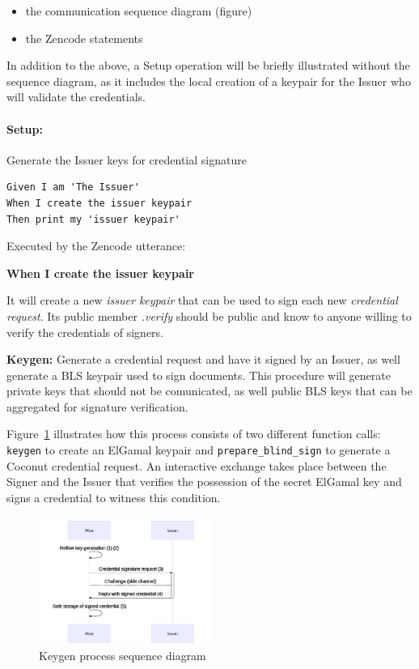 \documentclass[twocolumn]{article}
\begin{document}
\begin{itemize}
  \item the communication sequence diagram (figure)
  \item the Zencode statements
\end{itemize}

In addition to the above, a Setup operation will be briefly
illustrated without the sequence diagram, as it includes the local
creation of a keypair for the Issuer who will validate the
credentials.

\paragraph*{Setup:} Generate the Issuer keys for credential signature

\begin{lstlisting}[style=zencode]
Given I am 'The Issuer'
When I create the issuer keypair
Then print my 'issuer keypair'  
\end{lstlisting}

Executed by the Zencode utterance:

\textbf{When I create the issuer keypair}

It will create a new \emph{issuer keypair} that can be used to sign
each new \emph{credential request}. Its public member \emph{.verify}
should be public and know to anyone willing to verify the credentials
of signers.

\textbf{Keygen:} Generate a credential request and have it signed by
an Issuer, as well generate a BLS keypair used to sign documents. This
procedure will generate private keys that should not be comunicated,
as well public BLS keys that can be aggregated for signature
verification.

Figure~\ref{fig:keygen} illustrates how this process consists of two
different function calls: \verb!keygen! to create an ElGamal keypair
and \verb!prepare_blind_sign! to generate a Coconut credential
request. An interactive exchange takes place between the Signer and
the Issuer that verifies the possession of the secret ElGamal key and
signs a credential to witness this condition.

\begin{figure}
  \caption{Keygen process sequence diagram}
  \label{fig:keygen}
  \centering
  \includegraphics[width=0.5\textwidth]{keygen-seq}
\end{figure}
\end{document}
